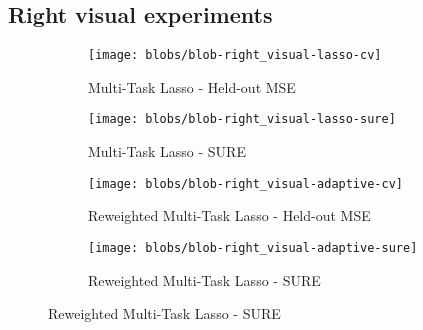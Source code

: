 \subsection{Right visual experiments}

\begin{figure}
    \centering
    \begin{subfigure}{6cm}
        \centering \texttt{[image: blobs/blob-right\_visual-lasso-cv]}
        \caption{Multi-Task Lasso - Held-out MSE}
    \end{subfigure}
    \begin{subfigure}{6cm}
        \centering \texttt{[image: blobs/blob-right\_visual-lasso-sure]}
        \caption{Multi-Task Lasso - SURE}
    \end{subfigure}

    \begin{subfigure}{6cm}
        \centering \texttt{[image: blobs/blob-right\_visual-adaptive-cv]}
        \caption{Reweighted Multi-Task Lasso - Held-out MSE}
    \end{subfigure}
    \begin{subfigure}{6cm}
        \centering \texttt{[image: blobs/blob-right\_visual-adaptive-sure]}
        \caption{Reweighted Multi-Task Lasso - SURE}
    \end{subfigure}
\end{figure}


